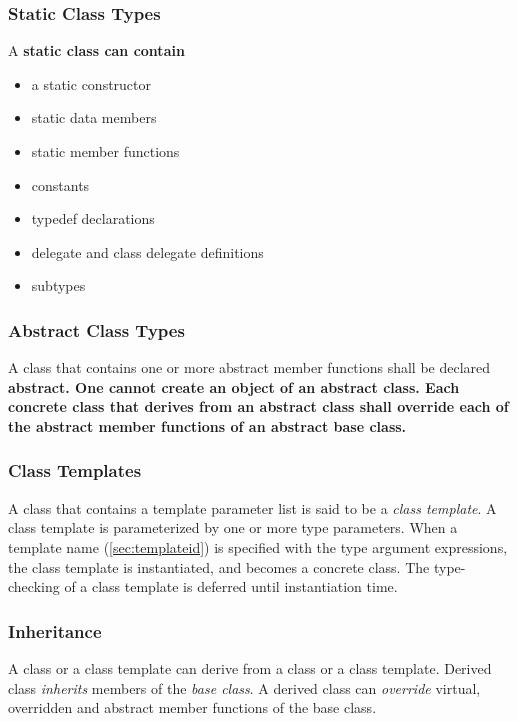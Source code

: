 \documentclass[a4paper,oneside,11pt]{article}
\begin{document}
\subsubsection{Static Class Types}

A \bf{static} class can contain
\begin{itemize}
\item a static constructor
\item static data members
\item static member functions
\item constants
\item typedef declarations
\item delegate and class delegate definitions
\item subtypes
\end{itemize}

\subsubsection{Abstract Class Types}

A class that contains one or more abstract member functions shall be declared \bf{abstract}.
One cannot create an object of an abstract class.
Each concrete class that derives from an abstract class shall override each of the
abstract member functions of an abstract base class.

\subsubsection{Class Templates}

A class that contains a template parameter list is said to be a \emph{class template}.
A class template is parameterized by one or more type parameters.
When a template name (\ref{sec:templateid}) is specified with the type argument expressions,
the class template is instantiated, and becomes a concrete class.
The type-checking of a class template is deferred until instantiation time.

\subsubsection{Inheritance}

A class or a class template can derive from a class or a class template.
Derived class \emph{inherits} members of the \emph{base class}.
A derived class can \emph{override} virtual, overridden and abstract member functions of the base class.
\end{document}

